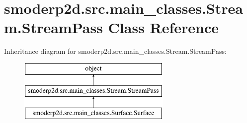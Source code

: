 \hypertarget{classsmoderp2d_1_1src_1_1main__classes_1_1Stream_1_1StreamPass}{\section{smoderp2d.\-src.\-main\-\_\-classes.\-Stream.\-Stream\-Pass Class Reference}
\label{classsmoderp2d_1_1src_1_1main__classes_1_1Stream_1_1StreamPass}
}
Inheritance diagram for smoderp2d.\-src.\-main\-\_\-classes.\-Stream.\-Stream\-Pass\-:\begin{figure}[H]
\begin{center}
\leavevmode
\includegraphics[height=3.000000cm]{classsmoderp2d_1_1src_1_1main__classes_1_1Stream_1_1StreamPass}
\end{center}
\end{figure}
